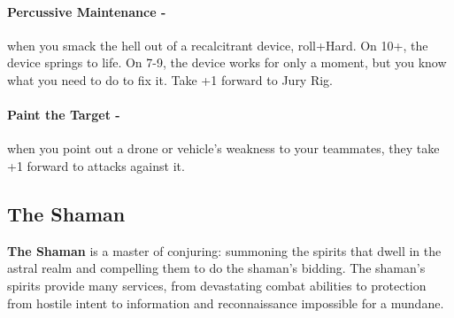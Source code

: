 \paragraph{Percussive Maintenance -} when you smack the hell out of a recalcitrant device, roll+Hard. On 10+, the device springs to life. On 7-9, the device works for only a moment, but you know what you need to do to fix it. Take +1 forward to Jury Rig.

\paragraph{Paint the Target -} when you point out a drone or vehicle’s weakness to your teammates, they take +1 forward to attacks against it.



\clearpage
\subsection{The Shaman}
\textbf{The Shaman} is a master of conjuring: summoning the spirits that dwell in the astral realm and compelling them to do the shaman’s bidding. The shaman’s spirits provide many services, from devastating combat abilities to protection from hostile intent to information and reconnaissance impossible for a mundane.

